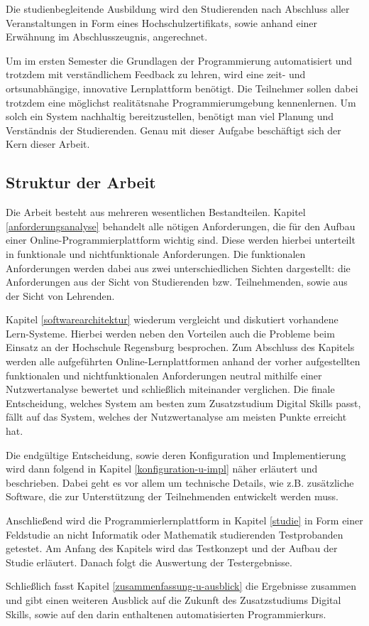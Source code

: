 Die studienbegleitende Ausbildung wird den Studierenden nach Abschluss aller
Veranstaltungen in Form eines Hochschulzertifikats, sowie anhand einer Erwähnung
im Abschlusszeugnis, angerechnet.

Um im ersten Semester die Grundlagen der Programmierung automatisiert und
trotzdem mit verständlichem Feedback zu lehren, wird eine zeit- und
ortsunabhängige, innovative Lernplattform benötigt. Die Teilnehmer sollen dabei
trotzdem eine möglichst realitätsnahe Programmierumgebung kennenlernen. Um solch
ein System nachhaltig bereitzustellen, benötigt man viel Planung und Verständnis
der Studierenden. Genau mit dieser Aufgabe beschäftigt sich der Kern dieser
Arbeit.

\subsection{Struktur der Arbeit}\label{struktur-der-arbeit}
Die Arbeit besteht aus mehreren wesentlichen Bestandteilen. Kapitel
\ref{anforderungsanalyse} behandelt alle nötigen Anforderungen, die für den
Aufbau einer Online-Programmierplattform wichtig sind. Diese werden hierbei
unterteilt in funktionale und nichtfunktionale Anforderungen. Die funktionalen
Anforderungen werden dabei aus zwei unterschiedlichen Sichten dargestellt: die
Anforderungen aus der Sicht von Studierenden bzw. Teilnehmenden, sowie aus der
Sicht von Lehrenden.

Kapitel \ref{softwarearchitektur} wiederum vergleicht und diskutiert vorhandene
Lern-Systeme. Hierbei werden neben den Vorteilen auch die Probleme
beim Einsatz an der Hochschule Regensburg besprochen. Zum Abschluss des Kapitels
werden alle aufgeführten Online-Lernplattformen anhand der vorher aufgestellten
funktionalen und nichtfunktionalen Anforderungen neutral mithilfe einer
Nutzwertanalyse bewertet und schließlich miteinander verglichen. Die finale
Entscheidung, welches System am besten zum Zusatzstudium Digital Skills passt,
fällt auf das System, welches der Nutzwertanalyse am meisten Punkte erreicht
hat.

Die endgültige Entscheidung, sowie deren Konfiguration und Implementierung wird
dann folgend in Kapitel \ref{konfiguration-u-impl} näher erläutert und
beschrieben. Dabei geht es vor allem um technische Details, wie z.B. zusätzliche
Software, die zur Unterstützung der Teilnehmenden entwickelt werden muss.

Anschließend wird die Programmierlernplattform in Kapitel \ref{studie} in Form
einer Feldstudie an nicht Informatik oder Mathematik studierenden Testprobanden
getestet. Am Anfang des Kapitels wird das Testkonzept und der Aufbau der Studie
erläutert. Danach folgt die Auswertung der Testergebnisse.

Schließlich fasst Kapitel \ref{zusammenfassung-u-ausblick} die Ergebnisse
zusammen und gibt einen weiteren Ausblick auf die Zukunft des Zusatzstudiums
Digital Skills, sowie auf den darin enthaltenen automatisierten Programmierkurs.
